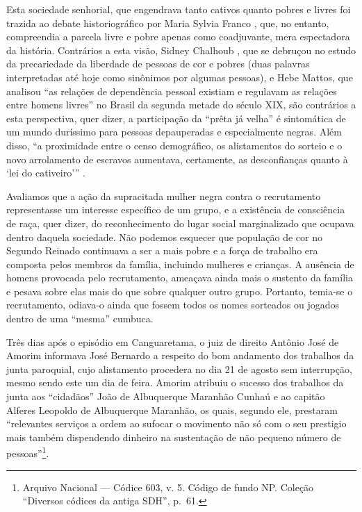 \begin{refsection}
Esta sociedade senhorial, que engendrava tanto cativos quanto pobres e livres foi trazida ao debate historiográfico por Maria Sylvia Franco \citeyear{Franco1997}, que, no entanto, compreendia a parcela livre e pobre apenas como coadjuvante, mera espectadora da história. Contrários a esta visão, Sidney Chalhoub \citeyear{Chalhoub1990}, que se debruçou no estudo da precariedade da liberdade de pessoas de cor e pobres (duas palavras interpretadas até hoje como sinônimos por algumas pessoas), e Hebe Mattos, que analisou “as relações de dependência pessoal existiam e regulavam as relações entre homens livres” \cite[p.~89]{Mattos1987} no Brasil da segunda metade do século XIX, são contrários a esta perspectiva, quer dizer, a participação da “prêta já velha” é sintomática de um mundo duríssimo para pessoas depauperadas e especialmente negras. Além disso, “a proximidade entre o censo demográfico, os alistamentos do sorteio e o novo arrolamento de escravos aumentava, certamente, as desconfianças quanto à ‘lei do cativeiro’” \cite[p.~271]{Mendes1999}.

Avaliamos que a ação da supracitada mulher negra contra o recrutamento representasse um interesse específico de um grupo, e a existência de consciência de raça, quer dizer, do reconhecimento do lugar social marginalizado que ocupava dentro daquela sociedade. Não podemos esquecer que população de cor no Segundo Reinado continuava a ser a mais pobre e a força de trabalho era composta pelos membros da família, incluindo mulheres e crianças. A ausência de homens provocada pelo recrutamento, ameaçava ainda mais o sustento da família e pesava sobre elas mais do que sobre qualquer outro grupo. Portanto, temia-se o recrutamento, odiava-o ainda que fossem todos os nomes sorteados ou jogados dentro de uma “mesma” cumbuca.  

Três dias após o episódio em Canguaretama, o juiz de direito Antônio José de Amorim informava José Bernardo a respeito do bom andamento dos trabalhos da junta paroquial, cujo alistamento procedera no dia 21 de agosto sem interrupção, mesmo sendo este um dia de feira. Amorim atribuiu o sucesso dos trabalhos da junta aos “cidadãos” João de Albuquerque Maranhão Cunhaú e ao capitão Alferes Leopoldo de Albuquerque Maranhão, os quais, segundo ele, prestaram “relevantes serviços a ordem ao sufocar o movimento não só com o seu prestigio mais também dispendendo dinheiro na sustentação de não pequeno número de pessoas”\footnote{Arquivo Nacional --- Códice 603, v. 5. Código de fundo NP. Coleção “Diversos códices da antiga SDH”, p.~61.}.


\end{refsection}

